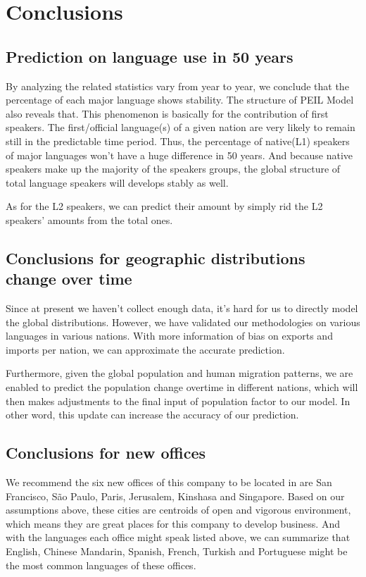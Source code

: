 \documentclass{mcmthesis}
\begin{document}
  \section{Conclusions}
  \subsection{Prediction on language use in 50 years}
  
  \indent \indent By analyzing the related statistics vary from year to year, we conclude that the percentage of each major language shows stability. The structure of PEIL Model also reveals that. This phenomenon is basically for the contribution of first speakers. The first/official language(s) of a given nation are very likely to remain still in the predictable time period. Thus, the percentage of native(L1) speakers of major languages won't have a huge difference in 50 years. And because native speakers make up the majority of the speakers groups, the global structure of total language speakers will develops stably as well. 
  
   \indent As for the L2 speakers, we can predict their amount by simply rid the L2 speakers' amounts from the total ones.
  
  \subsection{Conclusions for geographic distributions change over time}
  
  \indent Since at present we haven't collect enough data, it's hard for us to directly model the global distributions. However, we have validated  our methodologies on various languages in various nations. With more information of bias on exports and imports per nation, we can approximate the accurate prediction.
  
  \indent Furthermore, given the global population and human migration patterns, we are enabled to predict the population change overtime in different nations, which will then makes adjustments to the final input of population factor to our model. In other word, this update can increase the accuracy of our prediction.  
  
  \subsection{Conclusions for new offices}
  \indent \indent We recommend the six new offices of this company to be located in are San Francisco, São Paulo, Paris, Jerusalem, Kinshasa and Singapore. Based on our assumptions above, these cities are centroids of open and vigorous environment, which means they are great places for this company to develop business. And with the languages each office might speak listed above, we can summarize that English, Chinese Mandarin, Spanish, French, Turkish and Portuguese might be the most common languages of these offices.
  
\end{document}
